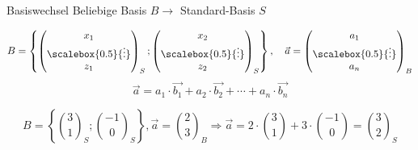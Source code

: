 \begin{KR}{Basiswechsel}
    Beliebige Basis $B \rightarrow$ Standard-Basis $S$

    $$
    B = \left\{ \begin{pmatrix} x_{1} \\ \scalebox{0.5}{\vdots} \\ z_{1} \end{pmatrix}_{S} ; \begin{pmatrix} x_{2} \\ \scalebox{0.5}{\vdots} \\ z_{2} \end{pmatrix}_{S} \right\}, \quad \vec{a} = \begin{pmatrix} a_{1} \\ \scalebox{0.5}{\vdots} \\ a_{n} \end{pmatrix}_{B}
    $$
    $$ 
    \vec{a}=a_{1} \cdot \overrightarrow{b_{1}}+a_{2} \cdot \overrightarrow{b_{2}}+\cdots+a_{n} \cdot \overrightarrow{b_{n}}
    $$
\end{KR}

\begin{example}
    $$B=\left\{\binom{3}{1}_{S} ;\binom{-1}{0}_{S}\right\}, \vec{a}=\binom{2}{3}_{B} \Rightarrow \vec{a}=2 \cdot \binom{3}{1}+3 \cdot \binom{-1}{0} = \binom{3}{2}_S$$
\end{example}

